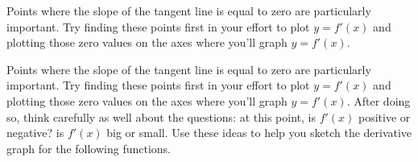 \begin{smallhint}
Points where the slope of the tangent line is equal to zero are particularly important.  Try finding these points first in your effort to plot $y = f'(x)$ and plotting those zero values on the axes where you'll graph $y = f'(x)$.  
\end{smallhint}
\begin{bighint}
Points where the slope of the tangent line is equal to zero are particularly important.  Try finding these points first in your effort to plot $y = f'(x)$ and plotting those zero values on the axes where you'll graph $y = f'(x)$.  After doing so, think carefully as well about the questions: at this point, is $f'(x)$ positive or negative?  is $f'(x)$ big or small.  Use these ideas to help you sketch the derivative graph for the following functions.
\end{bighint}
